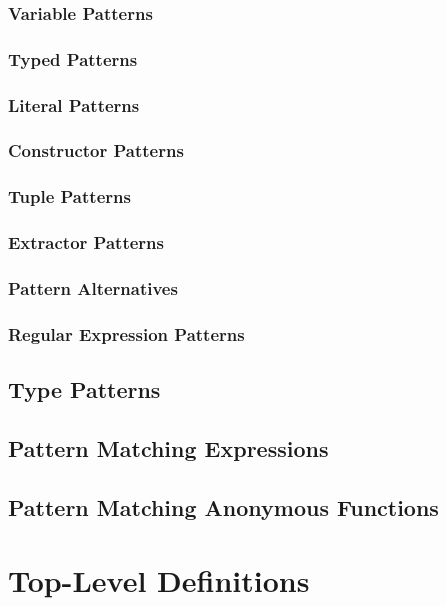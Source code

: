 \subsection{Variable Patterns}

\subsection{Typed Patterns}

\subsection{Literal Patterns}

\subsection{Constructor Patterns}

\subsection{Tuple Patterns}

\subsection{Extractor Patterns}

\subsection{Pattern Alternatives}

\subsection{Regular Expression Patterns}

\section{Type Patterns}

\section{Pattern Matching Expressions}

\section{Pattern Matching Anonymous Functions}

\chapter{Top-Level Definitions}

